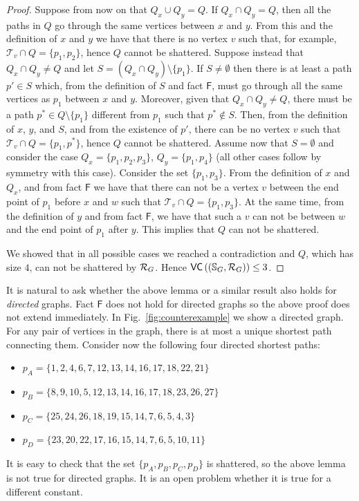 \begin{proof}
  Suppose from now on that $Q_x\cup Q_y=Q$.  If $Q_x\cap Q_y=Q$, then
  all the paths in $Q$ go through the same vertices between $x$ and $y$. From
  this and the definition of $x$ and $y$ we have that there is no vertex $v$
  such that, for example, $\mathcal{T}_v\cap Q=\{p_1,p_2\}$, hence $Q$ cannot be
  shattered. Suppose instead that $Q_x\cap Q_y\neq Q$ and let $S=(Q_x\cap
  Q_y)\setminus\{p_1\}$. If $S\neq\emptyset$ then there is at least a path
  $p'\in S$ which, from the definition of $S$ and fact $\mathsf{F}$, must go
  through all the same vertices as $p_1$ between $x$ and $y$. Moreover, given
  that $Q_x\cap Q_y\neq Q$, there must be a path $p^*\in Q\setminus\{p_1\}$
  different from $p_1$ such that $p^*\notin S$. Then, from the definition of
  $x$, $y$, and $S$, and from the existence of $p'$, there can be no vertex $v$
  such that $\mathcal{T}_v\cap Q=\{p_1,p^*\}$, hence $Q$ cannot be shattered.
  Assume now that $S=\emptyset$ and consider the case $Q_x=\{p_1,p_2,p_3\}$,
  $Q_y=\{p_1,p_4\}$ (all other cases follow by symmetry with this case).
  Consider the set $\{p_1,p_3\}$. From the definition of $x$ and $Q_x$, and from
  fact $\mathsf{F}$ we have that there can not be a vertex $v$ between the end
  point of $p_1$ before $x$ and $w$ such that $\mathcal{T}_v\cap Q=\{p_1,p_3\}$.
  At the same time, from the definition of $y$ and from fact $\mathsf{F}$, we
  have that such a $v$ can not be between $w$ and the end point of $p_1$ after
  $y$. This implies that $Q$ can not be shattered.

  We showed that in all possible cases we reached a contradiction and $Q$,
  which has size $4$, can not be shattered by $\mathcal{R}_G$. Hence
  $\mathsf{VC}\left((\mathbb{S}_G,\mathcal{R}_G)\right)\le 3$.
\end{proof}

It is natural to ask whether the above lemma or a similar result also holds for
\emph{directed} graphs. Fact $\mathsf{F}$ does not hold for directed graphs so
the above proof does not extend immediately. In Fig.~\ref{fig:counterexample} we show
a directed graph. For any pair of vertices in the graph, there is at most a
unique shortest path connecting them. Consider now the
following four directed shortest paths:
\begin{itemize}
  \item $p_A=\{1,2,4,6,7,12,13,14,16,17,18,22,21\}$
  \item $p_B=\{8,9,10,5,12,13,14,16,17,18,23,26,27\}$
  \item $p_C=\{25,24,26,18,19,15,14,7,6,5,4,3\}$
  \item $p_D=\{23,20,22,17,16,15,14,7,6,5,10,11\}$
\end{itemize}
It is easy to check that the set $\{p_A,p_B,p_C,p_D\}$ is shattered, so the
above lemma is not true for directed graphs. It is an open problem whether it is
true for a different constant.

